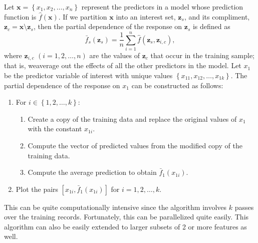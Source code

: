 Let $\boldsymbol{x} = \left\{x_1, x_2, \dots, x_n\right\}$ represent the predictors in a model whose prediction function is $\widehat{f}\left(\boldsymbol{x}\right)$. If we partition $\boldsymbol{x}$ into an interest set, $\boldsymbol{z}_s$, and its compliment, $\boldsymbol{z}_{c} = \boldsymbol{x} \setminus \boldsymbol{z}_s$, then the partial dependence of the response on $\boldsymbol{z}_s$ is defined as
\begin{equation}
\label{eqn:pdf}
\bar{f}_s\left(\boldsymbol{z}_s\right) = \frac{1}{n}\sum_{i = 1}^n\widehat{f}\left(\boldsymbol{z}_s,\boldsymbol{z}_{i, c}\right),
\end{equation}
where $\boldsymbol{z}_{i, c}$ $\left(i = 1, 2, \dots, n\right)$ are the values of $\boldsymbol{z}_c$ that occur in the training sample; that is, weaverage out the effects of all the other predictors in the model. Let $x_1$ be the predictor variable of interest with unique values $\left\{x_{11}, x_{12}, \dots, x_{1k}\right\}$. The partial dependence of the response on $x_1$ can be constructed as follows:
\begin{enumerate}
  \item For $i \in \left\{1, 2, \dots, k\right\}$:
  \begin{enumerate}
    \item Create a copy of the training data and replace the original values of $x_1$ with the constant $x_{1i}$.
    \item Compute the vector of predicted values from the modified copy of the training data.
    \item Compute the average prediction to obtain $\bar{f}_1\left(x_{1i}\right)$.
  \end{enumerate}
  \item Plot the pairs $\left[x_{1i}, \bar{f}_1\left(x_{1i}\right)\right]$ for $i = 1, 2, \dotsc, k$.
\end{enumerate}
This can be quite computationally intensive since the algorithm involves $k$ passes over the training records. Fortunately, this can be parallelized quite easily. This algorithm can also be easily extended to larger subsets of 2 or more features as well.

